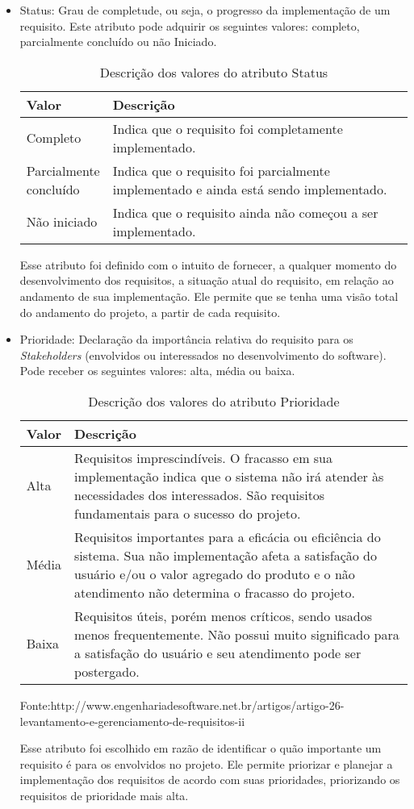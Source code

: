 \begin{itemize}
\item Status:
Grau de completude, ou seja, o progresso da implementação de um requisito. Este atributo pode adquirir os seguintes valores: completo, parcialmente concluído ou não Iniciado.

\begin{table}[h]
\centering
\caption{Descrição dos valores do atributo Status}
\label{Rotulo}
\begin{tabular}{ | l | p{1\linewidth} | }
\hline
\textbf{Valor} & \textbf{Descrição} \\ \hline
Completo &  Indica que o requisito foi completamente implementado. \\ \hline
Parcialmente concluído & Indica que o requisito foi parcialmente implementado e ainda está sendo implementado. \\ \hline
Não iniciado & Indica que o requisito ainda não começou a ser implementado. \\ \hline
\end{tabular}
\end{table}

Esse atributo foi definido com o intuito de fornecer, a qualquer momento do desenvolvimento dos requisitos, a situação atual do requisito, em relação ao andamento de sua implementação. Ele permite que se tenha uma visão total do andamento do projeto, a partir de cada requisito.

\item Prioridade:
Declaração da importância relativa do requisito para os \textit{Stakeholders} (envolvidos ou interessados no desenvolvimento do software). Pode receber os seguintes valores: alta, média ou baixa.

\begin{table}[h]
\centering
\caption{Descrição dos valores do atributo Prioridade}
\label{Rotulo}
\begin{tabular}{ | l | p{1\linewidth} | }
\hline
\textbf{Valor} & \textbf{Descrição} \\ \hline
Alta &  Requisitos imprescindíveis. O fracasso em sua implementação indica que o sistema não irá atender às necessidades dos interessados. São requisitos fundamentais para o sucesso do projeto. \\ \hline
Média & Requisitos importantes para a eficácia ou eficiência do sistema. Sua não implementação afeta a satisfação do usuário e/ou o valor agregado do produto e o não atendimento não determina o fracasso do projeto. \\ \hline
Baixa & Requisitos úteis, porém menos críticos, sendo usados menos frequentemente. Não possui muito significado para a satisfação do usuário e seu atendimento pode ser postergado. \\ \hline
\end{tabular}
\end{table}
\tiny Fonte:http://www.engenhariadesoftware.net.br/artigos/artigo-26-levantamento-e-gerenciamento-de-requisitos-ii

\normalsize Esse atributo foi escolhido em razão de identificar o quão importante um requisito é para os envolvidos no projeto. Ele permite priorizar e planejar a implementação dos requisitos de acordo com suas prioridades, priorizando os requisitos de prioridade mais alta.


\end{itemize}

